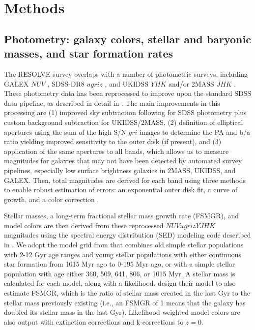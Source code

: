 \documentclass[iop,apj]{emulateapj}
\begin{document}
\section{Methods}
\label{methods}

\subsection{Photometry: galaxy colors, stellar and baryonic masses, and star formation rates}
\label{phot}
  The RESOLVE survey overlaps with a number of photometric surveys, including GALEX $NUV$ \citep{Morrissey2007}, SDSS-DR8 $ugriz$ \citep{Aihara2011}, and UKIDSS $YHK$ and/or 2MASS $JHK$ \citep{Skrutskie2006}. These photometry data has been reprocessed to improve upon the standard SDSS data pipeline, as described in detail in \citet{Eckert2015}. The main improvements in this processing are (1) improved sky subtraction following \citet{Blanton2011} for SDSS photometry plus custom background subtraction for UKIDSS/2MASS, (2) definition of elliptical apertures using the sum of the high S/N $gri$ images to determine the PA and b/a ratio yielding improved sensitivity to the outer disk (if present), and (3) application of the same apertures to all bands, which allows us to measure magnitudes for galaxies that may not have been detected by automated survey pipelines, especially low surface brightness galaxies in 2MASS, UKIDSS, and GALEX. Then, total magnitudes are derived for each band using three methods to enable robust estimation of errors: an exponential outer disk fit, a curve of growth, and a color correction  \citep[Figure 2 in][]{Eckert2015}. 

Stellar masses, a long-term fractional stellar mass growth rate (FSMGR), and model colors are then derived from these reprocessed $NUVugrizYJHK$ magnitudes using the spectral energy distribution (SED) modeling code described in  \citet{Kannappan2013}. We adopt the model grid from \citet{Kannappan2013} that combines old simple stellar populations with 2-12 Gyr age ranges and young stellar populations with either continuous star formation from 1015 Myr ago to 0-195 Myr ago, or with a simple stellar population with age either 360, 509, 641, 806, or 1015 Myr. A stellar mass is calculated for each model, along with a likelihood. \citet{Kannappan2013} design their model to also estimate FSMGR, which is the ratio of stellar mass created in the last Gyr to the stellar mass previously existing (i.e., an FSMGR of 1 means that the galaxy has doubled its stellar mass in the last Gyr). Likelihood weighted model colors are also output with extinction corrections and k-corrections to $z=0$. 
\end{document}
